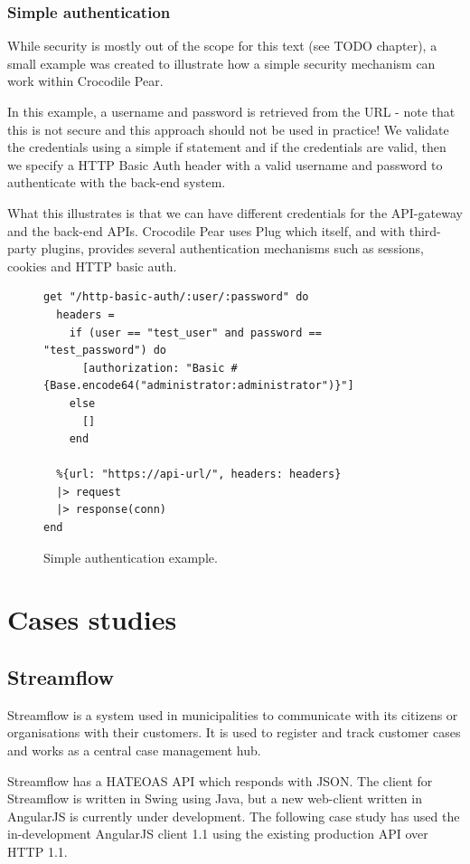 \documentclass{cslthse-msc}
\begin{document}
\subsection{Simple authentication}
While security is mostly out of the scope for this text (see TODO chapter), a small example was created to illustrate how a simple security mechanism can work within Crocodile Pear.

In this example, a username and password is retrieved from the URL - note that this is not secure and this approach should not be used in practice! We validate the credentials using a simple if statement and if the credentials are valid, then we specify a HTTP Basic Auth header with a valid username and password to authenticate with the back-end system.

What this illustrates is that we can have different credentials for the API-gateway and the back-end APIs. Crocodile Pear uses Plug which itself, and with third-party plugins, provides several authentication mechanisms such as sessions, cookies and HTTP basic auth.

\begin{figure}[H]
  \centering
\begin{lstlisting}[breaklines=true,frame=single]
get "/http-basic-auth/:user/:password" do
  headers =
    if (user == "test_user" and password == "test_password") do
      [authorization: "Basic #{Base.encode64("administrator:administrator")}"]
    else
      []
    end
  
  %{url: "https://api-url/", headers: headers}
  |> request
  |> response(conn)
end
\end{lstlisting}
  \caption{Simple authentication example.}
\end{figure}


\chapter{Cases studies}
\section{Streamflow}
Streamflow\cite{streamflow} is a system used in municipalities to communicate with its citizens or organisations with their customers. It is used to register and track customer cases and works as a central case management hub.

Streamflow has a HATEOAS API which responds with JSON. The client for Streamflow is written in Swing using Java, but a new web-client written in AngularJS is currently under development. The following case study has used the in-development AngularJS client 1.1 using the existing production API over HTTP 1.1.
\end{document}
